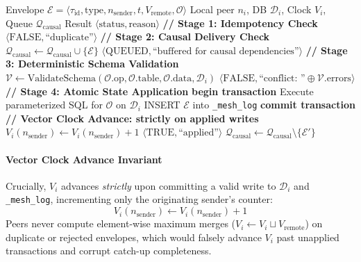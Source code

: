 \begin{algorithm}[!t]
\caption{Causal Hold-Back Transaction Ingestion}
\label{alg:remote_ingest}
\begin{algorithmic}[1]
\Require Envelope $\mathcal{E} = \langle \tau_{\text{id}}, \text{type}, n_{\text{sender}}, t, V_{\text{remote}}, \mathcal{O} \rangle$
\Require Local peer $n_i$, DB $\mathcal{D}_i$, Clock $V_i$, Queue $\mathcal{Q}_{\text{causal}}$
\Ensure Result $\langle \text{status}, \text{reason} \rangle$
    \State \textbf{// Stage 1: Idempotency Check}
        \State \Return $\langle \text{FALSE}, \text{``duplicate''} \rangle$ 
    \EndIf
    \State \textbf{// Stage 2: Causal Delivery Check}
        \State $\mathcal{Q}_{\text{causal}} \gets \mathcal{Q}_{\text{causal}} \cup \{\mathcal{E}\}$ 
        \State \Return $\langle \text{QUEUED}, \text{``buffered for causal dependencies''} \rangle$
    \EndIf
    \State \textbf{// Stage 3: Deterministic Schema Validation}
    \State $\mathcal{V} \gets \text{ValidateSchema}(\mathcal{O}.\text{op}, \mathcal{O}.\text{table}, \mathcal{O}.\text{data}, \mathcal{D}_i)$
        \State \Return $\langle \text{FALSE}, \text{``conflict: ''} \oplus \mathcal{V}.\text{errors} \rangle$
    \EndIf
    \State \textbf{// Stage 4: Atomic State Application}
    \State \textbf{begin transaction}
    \State Execute parameterized SQL for $\mathcal{O}$ on $\mathcal{D}_i$
    \State INSERT $\mathcal{E}$ into \texttt{\_mesh\_log}
    \State \textbf{commit transaction}
    \State \textbf{// Vector Clock Advance: strictly on applied writes}
    \State $V_i(n_{\text{sender}}) \gets V_i(n_{\text{sender}}) + 1$
    \State {}
    \State \Return $\langle \text{TRUE}, \text{``applied''} \rangle$
\EndFunction
\Statex
{}
        \State $\mathcal{Q}_{\text{causal}} \gets \mathcal{Q}_{\text{causal}} \setminus \{\mathcal{E}'\}$
        \State {}
    \EndWhile
\EndFunction
\end{algorithmic}
\end{algorithm}

\paragraph{Vector Clock Advance Invariant}
Crucially, $V_i$ advances \textit{strictly} upon committing a valid write to $\mathcal{D}_i$ and \texttt{\_mesh\_log}, incrementing only the originating sender's counter:
\begin{equation}
V_i(n_{\text{sender}}) \gets V_i(n_{\text{sender}}) + 1
\end{equation}
Peers never compute element-wise maximum merges ($V_i \gets V_i \sqcup V_{\text{remote}}$) on duplicate or rejected envelopes, which would falsely advance $V_i$ past unapplied transactions and corrupt catch-up completeness.

